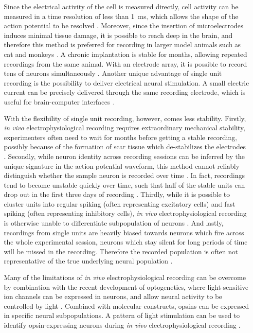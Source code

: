 Since the electrical activity of the cell is measured directly, cell activity can be measured in a time resolution of less than \SI{1}{\ms}, which allows the shape of the action potential to be resolved \citep{lutcke13}. Moreover, since the insertion of microelectrodes induces minimal tissue damage, it is possible to reach deep in the brain, and therefore this method is preferred for recording in larger model animals such as cat and monkeys \citep{lutcke13}. A chronic implantation is stable for months, allowing repeated recordings from the same animal. With an electrode array, it is possible to record tens of neurons simultaneously \citep{lutcke13}. Another unique advantage of single unit recording is the possibility to deliver electrical neural stimulation. A small electric current can be precisely delivered through the same recording electrode, which is useful for brain-computer interfaces \citep{hatsopoulos09}. 

With the flexibility of single unit recording, however, comes less stability. Firstly, \textit{in vivo} electrophysiological recording requires extraordinary mechanical stability, experimenters often need to wait for months before getting a stable recording, possibly because of the formation of scar tissue which de-stabilizes the electrodes \citep{jackson07}. Secondly, while neuron identity across recording sessions can be inferred by the unique signature in the action potential waveform, this method cannot reliably distinguish whether the sample neuron is recorded over time \citep{rousche98, schmitzer-torbert04, tolias07}. In fact, recordings tend to become unstable quickly over time, such that half of the stable units can drop out in the first three days of recording \citep{fraser12}. Thirdly, while it is possible to cluster units into regular spiking (often representing excitatory cells) and fast spiking (often representing inhibitory cells), \textit{in vivo} electrophysiological recording is otherwise unable to differentiate subpopulation of neurons \citep{connors90}. And lastly, recordings from single units are heavily biased towards neurons which fire across the whole experimental session, neurons which stay silent for long periods of time will be missed in the recording. Therefore the recorded population is often not representative of the true underlying neural population \citep{lutcke13}. 

Many of the limitations of \textit{in vivo} electrophysiological recording can be overcome by combination with the recent development of optogenetics, where light-sensitive ion channels can be expressed in neurons, and allow neural activity to be controlled by light \citep{yizhar11}. Combined with molecular constructs, opsins can be expressed in specific neural subpopulations. A pattern of light stimulation can be used to identify opsin-expressing neurons during \textit{in vivo} electrophysiological recording \citep{zhao11}. 

